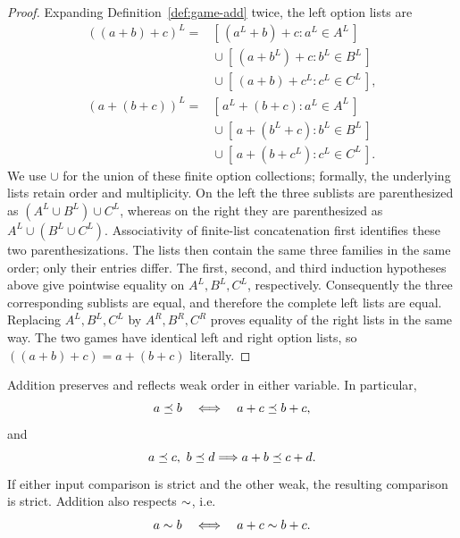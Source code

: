 \begin{proof}
  Expanding Definition~\ref{def:game-add} twice, the left option lists are
  \[
    \begin{aligned}
      ((a+b)+c)^L
       ={}&[\,(a^L+b)+c:a^L\in A^L\,]\\
          &{}\cup[\,(a+b^L)+c:b^L\in B^L\,]\\
          &{}\cup[\,(a+b)+c^L:c^L\in C^L\,],\\[2mm]
      (a+(b+c))^L
       ={}&[\,a^L+(b+c):a^L\in A^L\,]\\
          &{}\cup[\,a+(b^L+c):b^L\in B^L\,]\\
          &{}\cup[\,a+(b+c^L):c^L\in C^L\,].
    \end{aligned}
  \]
  We use \(\cup\) for the union of these finite option collections; formally, the underlying
  lists retain order and multiplicity.  On the left the three sublists are parenthesized as
  \((A^L\cup B^L)\cup C^L\), whereas on the right they are parenthesized as
  \(A^L\cup(B^L\cup C^L)\).  Associativity of finite-list concatenation first identifies these
  two parenthesizations.
  The lists then contain the same three families in the same order; only their
  entries differ.  The first, second, and third induction
  hypotheses above give pointwise equality on \(A^L,B^L,C^L\), respectively.
  Consequently the three corresponding sublists are equal, and therefore the
  complete left lists are equal.  Replacing \(A^L,B^L,C^L\) by
  \(A^R,B^R,C^R\) proves equality of the right lists in the same way.  The two
  games have identical left and right option lists, so
  \(((a+b)+c)=a+(b+c)\) literally.
\end{proof}
\begin{theorem}
  \label{thm:game-add-order}
  \leanok
  Addition preserves and reflects weak order in either variable.  In particular,
  \[
    a\preceq b\quad\Longleftrightarrow\quad a+c\preceq b+c,
  \]
  and
  \[
    a\preceq c,\ b\preceq d\Longrightarrow a+b\preceq c+d.
  \]
  If either input comparison is strict and the other weak, the resulting comparison is strict.
  Addition also respects \(\sim\), i.e.
  \[
    a\sim b\quad\Longleftrightarrow\quad a+c\sim b+c.
  \]
\end{theorem}
